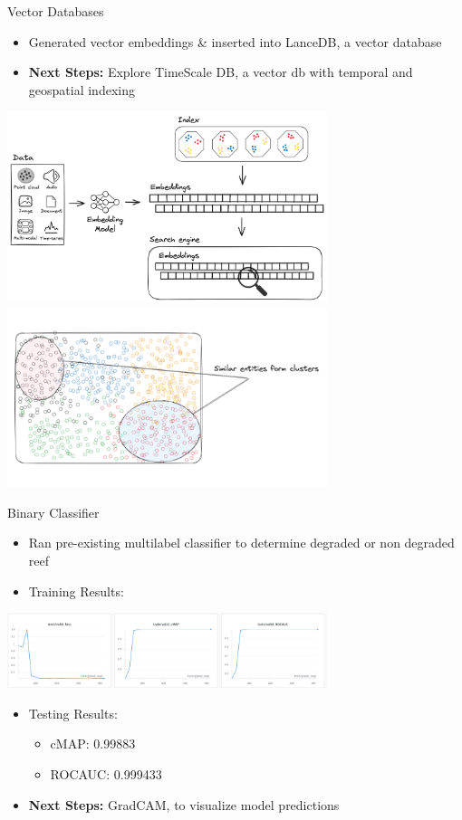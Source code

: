 \begin{frame}{Vector Databases}
    \begin{itemize}
        \item Generated vector embeddings \& inserted into LanceDB, a vector database
        \item \textbf{Next Steps:} Explore TimeScale DB, a vector db with temporal and geospatial indexing
    \end{itemize}
    \includegraphics[height=0.4\textheight,width=0.7\textwidth,keepaspectratio]{images/aid_lancedb_1.png}
    \includegraphics[height=0.4\textheight,width=0.7\textwidth,keepaspectratio]{images/aid_lancedb_2.png}
\end{frame}

\begin{frame}{Binary Classifier}
    \begin{itemize}
        \item Ran pre-existing multilabel classifier to determine degraded or non degraded reef
        \item Training Results:
    \end{itemize}
    \includegraphics[height=0.4\textheight,width=0.7\textwidth,keepaspectratio]{images/aid_training_results.jpg}
    \begin{itemize}
        \item Testing Results: 
        \begin{itemize}
            \item cMAP: 0.99883
            \item ROCAUC: 0.999433
        \end{itemize}
        \item \textbf{Next Steps:} GradCAM, to visualize model predictions  
    \end{itemize}  
\end{frame}

